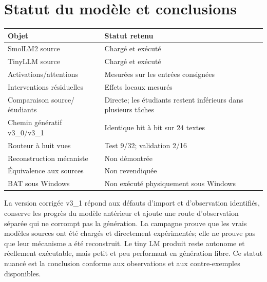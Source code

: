 \documentclass[11pt,a4paper]{article}
\begin{document}
\section{Statut du modèle et conclusions}
\begin{center}
\small
\begin{tabular}{p{4.8cm}p{8.3cm}}
\toprule
\textbf{Objet} & \textbf{Statut retenu}\\
\midrule
SmolLM2 source & Chargé et exécuté\\
TinyLLM source & Chargé et exécuté\\
Activations/attentions & Mesurées sur les entrées consignées\\
Interventions résiduelles & Effets locaux mesurés\\
Comparaison source/étudiants & Directe; les étudiants restent inférieurs dans plusieurs tâches\\
Chemin génératif v3\_0/v3\_1 & Identique bit à bit sur 24 textes\\
Routeur à huit vues & Test 9/32; validation 2/16\\
Reconstruction mécaniste & Non démontrée\\
Équivalence aux sources & Non revendiquée\\
BAT sous Windows & Non exécuté physiquement sous Windows\\
\bottomrule
\end{tabular}
\end{center}

La version corrigée v3\_1 répond aux défauts d'import et d'observation identifiés, conserve les progrès du modèle antérieur et ajoute une route d'observation séparée qui ne corrompt pas la génération. La campagne prouve que les vrais modèles sources ont été chargés et directement expérimentés; elle ne prouve pas que leur mécanisme a été reconstruit. Le tiny LM produit reste autonome et réellement exécutable, mais petit et peu performant en génération libre. Ce statut nuancé est la conclusion conforme aux observations et aux contre-exemples disponibles.
\end{document}
